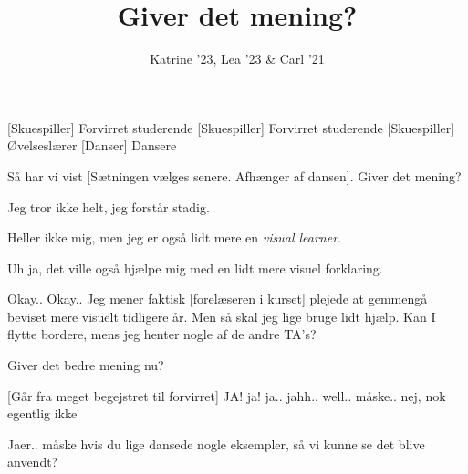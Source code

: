 \documentclass[a4paper,11pt]{article}
\title{Giver det mening?}
\author{Katrine '23, Lea '23 \& Carl '21}
\begin{document}
\maketitle

\begin{roles}
[Skuespiller] Forvirret studerende
[Skuespiller] Forvirret studerende
[Skuespiller] Øvelseslærer
[Danser] Dansere
\end{roles}

\begin{sketch}

 Så har vi vist [Sætningen vælges senere. Afhænger af dansen]. Giver det mening? 


 Jeg tror ikke helt, jeg forstår stadig. 

 Heller ikke mig, men jeg er også lidt mere en \textit{visual learner}.

 Uh ja, det ville også hjælpe mig med en lidt mere visuel forklaring.

 Okay.. Okay.. Jeg mener faktisk [forelæseren i kurset] plejede at gemmengå beviset mere visuelt tidligere år. Men så skal jeg lige bruge lidt hjælp. Kan I flytte bordere, mens jeg henter nogle af de andre TA's?




 Giver det bedre mening nu?

[Går fra meget begejstret til forvirret] JA! ja! ja.. jahh.. well.. måske.. nej, nok egentlig ikke

 Jaer.. måske hvis du lige dansede nogle eksempler, så vi kunne se det blive anvendt?
\end{sketch}
\end{document}
